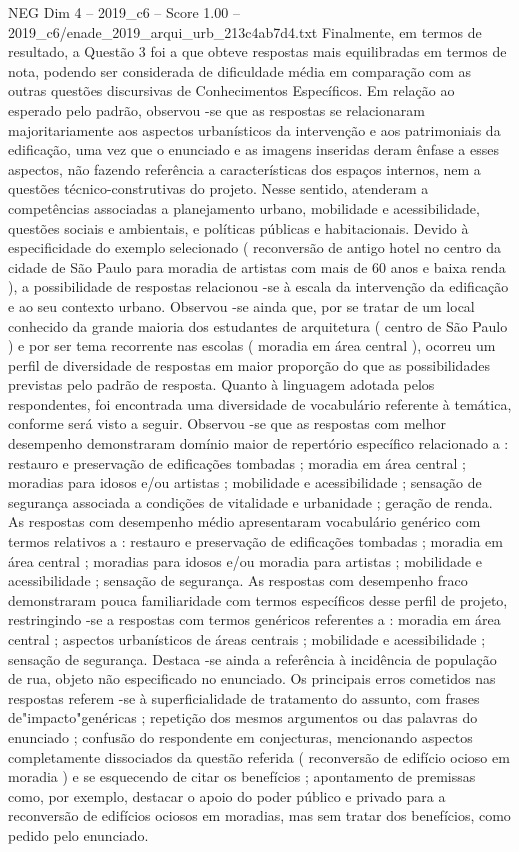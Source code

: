 \begin{textsample}{NEG Dim 4 – 2019\_c6 – Score 1.00 – 2019\_c6/enade\_2019\_arqui\_urb\_213c4ab7d4.txt}
Finalmente, em termos de resultado, a Questão 3 foi a que obteve respostas mais equilibradas em termos de nota, podendo ser considerada de dificuldade média em comparação com as outras questões discursivas de Conhecimentos Específicos.
Em relação ao esperado pelo padrão, observou -se que as respostas se relacionaram majoritariamente aos aspectos urbanísticos da intervenção e aos patrimoniais da edificação, uma vez que o enunciado e as imagens inseridas deram ênfase a esses aspectos, não fazendo referência a características dos espaços internos, nem a questões técnico-construtivas do projeto.
Nesse sentido, atenderam a competências associadas a planejamento urbano, mobilidade e acessibilidade, questões sociais e ambientais, e políticas públicas e habitacionais.
Devido à especificidade do exemplo selecionado ( reconversão de antigo hotel no centro da cidade de São Paulo para moradia de artistas com mais de 60 anos e baixa renda ), a possibilidade de respostas relacionou -se à escala da intervenção da edificação e ao seu contexto urbano.
Observou -se ainda que, por se tratar de um local conhecido da grande maioria dos estudantes de arquitetura ( centro de São Paulo ) e por ser tema recorrente nas escolas ( moradia em área central ), ocorreu um perfil de diversidade de respostas em maior proporção do que as possibilidades previstas pelo padrão de resposta.
Quanto à linguagem adotada pelos respondentes, foi encontrada uma diversidade de vocabulário referente à temática, conforme será visto a seguir.
Observou -se que as respostas com melhor desempenho demonstraram domínio maior de repertório específico relacionado a : restauro e preservação de edificações tombadas ; moradia em área central ; moradias para idosos e/ou artistas ; mobilidade e acessibilidade ; sensação de segurança associada a condições de vitalidade e urbanidade ; geração de renda.
As respostas com desempenho médio apresentaram vocabulário genérico com termos relativos a : restauro e preservação de edificações tombadas ; moradia em área central ; moradias para idosos e/ou moradia para artistas ; mobilidade e acessibilidade ; sensação de segurança.
As respostas com desempenho fraco demonstraram pouca familiaridade com termos específicos desse perfil de projeto, restringindo -se a respostas com termos genéricos referentes a : moradia em área central ; aspectos urbanísticos de áreas centrais ; mobilidade e acessibilidade ; sensação de segurança.
Destaca -se ainda a referência à incidência de população de rua, objeto não especificado no enunciado.
Os principais erros cometidos nas respostas referem -se à superficialidade de tratamento do assunto, com frases de"impacto"genéricas ; repetição dos mesmos argumentos ou das palavras do enunciado ; confusão do respondente em conjecturas, mencionando aspectos completamente dissociados da questão referida ( reconversão de edifício ocioso em moradia ) e se esquecendo de citar os benefícios ; apontamento de premissas como, por exemplo, destacar o apoio do poder público e privado para a reconversão de edifícios ociosos em moradias, mas sem tratar dos benefícios, como pedido pelo enunciado.

\end{textsample}
